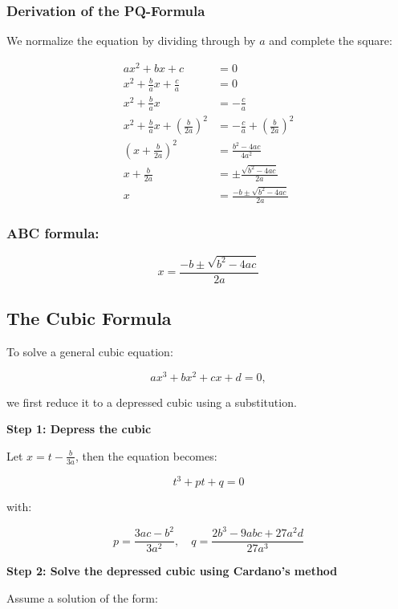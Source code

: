 \subsubsection{Derivation of the PQ-Formula}

We normalize the equation by dividing through by \(a\) and complete the square:

\begin{align*}
    ax^2 + bx + c &= 0 \\
    x^2 + \frac{b}{a}x + \frac{c}{a} &= 0 \\
    x^2 + \frac{b}{a}x &= -\frac{c}{a} \\
    x^2 + \frac{b}{a}x + {\left(\frac{b}{2a}\right)}^2 &= -\frac{c}{a} + {\left(\frac{b}{2a}\right)}^2 \\
    {\left(x + \frac{b}{2a}\right)}^2 &= \frac{b^2 - 4ac}{4a^2} \\
    x + \frac{b}{2a} &= \pm \frac{\sqrt{b^2 - 4ac}}{2a} \\
    x &= \frac{-b \pm \sqrt{b^2 - 4ac}}{2a}
\end{align*}

\subsubsection{ABC formula:}

\[
    x = \frac{-b \pm \sqrt{b^2 - 4ac}}{2a}
\]

\subsection{The Cubic Formula}

To solve a general cubic equation:

\[
    ax^3 + bx^2 + cx + d = 0,
\]

we first reduce it to a depressed cubic using a substitution.
\vspace{\baselineskip}

\textbf{Step 1: Depress the cubic}

Let \(x = t - \frac{b}{3a}\), then the equation becomes:

\[
    t^3 + pt + q = 0
\]

with:

\[
    p = \frac{3ac - b^2}{3a^2}, \quad q = \frac{2b^3 - 9abc + 27a^2d}{27a^3}
\]

\textbf{Step 2: Solve the depressed cubic using Cardano’s method}

Assume a solution of the form:

